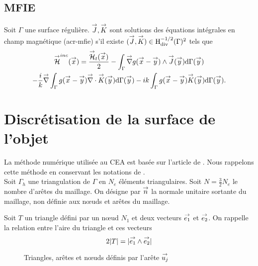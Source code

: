     \subsection{MFIE}
      \begin{prop}
        \label{eq:form_int:MFIE}
        Soit \(\Gamma\) une surface régulière.
        \(\vJ,\vK\) sont solutions des équations intégrales en champ magnétique (\gls{acr-mfie}) s'il existe \((\vJ,\vK) \in \Hdiv^{-1/2}(\Gamma)^2\) tels que
        \begin{multline*}
          \vH^{inc}(\vx) =
          \frac{\vH_t(\vx)}{2}
            - \int_{\Gamma} \vgrad g(\vx - \vy) \pvect \vJ(\vy) \dd{\Gamma}(\vy) \\
          - \frac{i}{k} \vgrad \int_{\Gamma}  g(\vx - \vy)\vdiv\vK(\vy)\dd{\Gamma}(\vy)
            - ik \int_{\Gamma} g(\vx - \vy)\vK(\vy)\dd{\Gamma}(\vy).
        \end{multline*}
      \end{prop}

\section{Discrétisation de la surface de l'objet}

  La méthode numérique utilisée au CEA  est basée sur l'article de \cite{medgyesi-mitschang_integral_1985}.
  Nous rappelons cette méthode en conservant les notations de \cite{stupfel_implementation_2015}.\\

  Soit \(\Gamma_h\) une triangulation de \(\Gamma\) en \(N_e\) éléments triangulaires.
  Soit \(N=\frac{3}{2}N_e\) le nombre d'arêtes du maillage.
  On désigne par \(\vn\) la normale unitaire sortante du maillage, non définie aux nœuds et arêtes du maillage.

  Soit \(T\) un triangle défini par un nœud \(N_1\) et deux vecteurs \(\vect{e_1}\) et \(\vect{e_2}\).
  On rappelle la relation entre l'aire du triangle et ces vecteurs
  \begin{equation*}
    2|T| = |\vect{e_1}\pvect\vect{e_2}|
  \end{equation*}

  \newcommand{\ncouche}{6}
  \newcommand{\setnodes}[6]{
      \renewcommand{\xa}{#1}
      \renewcommand{\ya}{#2}
      \renewcommand{\xb}{#3}
      \renewcommand{\yb}{#4}
      \renewcommand{\xc}{#5}
      \renewcommand{\yc}{#6}
  }
  \newcommand{\xa}{0.0}
  \newcommand{\ya}{0.0}
  \newcommand{\xb}{3.0}
  \newcommand{\yb}{0.0}
  \newcommand{\xc}{0.0}
  \newcommand{\yc}{3.0}
  \begin{figure}[h!tb]
    \begin{center}
      \begin{tikzpicture}[scale=1]
        
      \end{tikzpicture}
    \end{center}
    \caption{Triangles, arêtes et nœuds définis par l'arête \(\uj\)}
    \label{fig:form_int:fon_base:tri}
  \end{figure}

